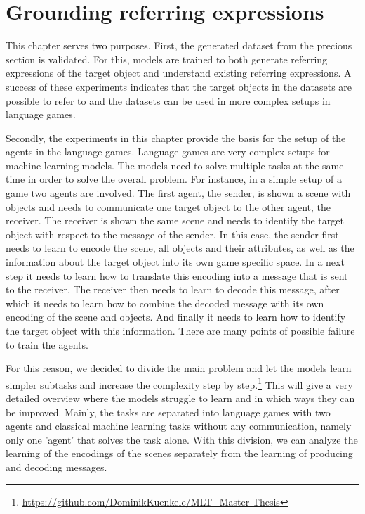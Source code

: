 \section{Grounding referring expressions}
\label{sec:preexperiments}

This chapter serves two purposes.
First, the generated dataset from the precious section is validated.
For this, models are trained to both generate referring expressions of the target object and understand existing referring expressions.
A success of these experiments indicates that the target objects in the datasets are possible to refer to and the datasets can be used in more complex setups in language games.

Secondly, the experiments in this chapter provide the basis for the setup of the agents in the language games.
Language games are very complex setups for machine learning models.
The models need to solve multiple tasks at the same time in order to solve the overall problem.
For instance, in a simple setup of a game two agents are involved.
The first agent, the sender, is shown a scene with objects and needs to communicate one target object to the other agent, the receiver.
The receiver is shown the same scene and needs to identify the target object with respect to the message of the sender.
In this case, the sender first needs to learn to encode the scene, all objects and their attributes, as well as the information about the target object into its own game specific space.
In a next step it needs to learn how to translate this encoding into a message that is sent to the receiver.
The receiver then needs to learn to decode this message, after which it needs to learn how to combine the decoded message with its own encoding of the scene and objects.
And finally it needs to learn how to identify the target object with this information.
There are many points of possible failure to train the agents.

For this reason, we decided to divide the main problem and let the models learn simpler subtasks and increase the complexity step by step.\footnote{\href{https://github.com/DominikKuenkele/MLT\_Master-Thesis}{https://github.com/DominikKuenkele/MLT\_Master-Thesis}}
This will give a very detailed overview where the models struggle to learn and in which ways they can be improved.
Mainly, the tasks are separated into language games with two agents and classical machine learning tasks without any communication, namely only one 'agent' that solves the task alone.
With this division, we can analyze the learning of the encodings of the scenes separately from the learning of producing and decoding messages.

